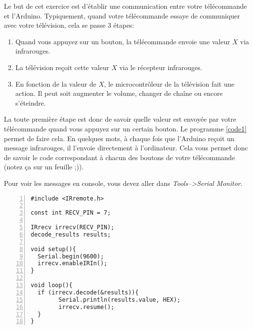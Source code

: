 Le but de cet exercice est d'établir une communication entre votre télécommande et l'Arduino. Typiquement, quand votre télécommande essaye de communiquer avec votre télévision, cela se passe 3 étapes:
\begin{enumerate}
  \item Quand vous appuyez sur un bouton, la télécommande envoie une valeur $X$
  via infrarouges.
  \item La télévision reçoit cette valeur $X$ via le récepteur infrarouges.
  \item En fonction de la valeur de $X$, le microcontrôleur de la télévision fait une action. Il peut
  soit augmenter le volume, changer de chaîne ou encore s'éteindre.
\end{enumerate}

La toute première étape est donc de savoir quelle valeur est envoyée par votre télécommande quand vous appuyez sur un certain bouton. Le programme \autoref{code1} permet de faire cela. En quelques mots, à chaque fois que l'Arduino reçoit un message infrarouges, il l'envoie directement à l'ordinateur. Cela vous permet donc de savoir le code correspondant à chacun des boutons de votre télécommande (notez ça sur un feuille ;)).

Pour voir les messages en console, vous devez aller dans \textit{Tools-->Serial Monitor}.

\lstset{language=C}
\begin{lstlisting}[frame=single,numbers=left,numberstyle=\small,label={code1},caption={Lecture de la télécommande}]
#include <IRremote.h>

const int RECV_PIN = 7;

IRrecv irrecv(RECV_PIN);
decode_results results;

void setup(){
  Serial.begin(9600);
  irrecv.enableIRIn();
}

void loop(){
  if (irrecv.decode(&results)){
        Serial.println(results.value, HEX);
        irrecv.resume();
  }
}
\end{lstlisting}

